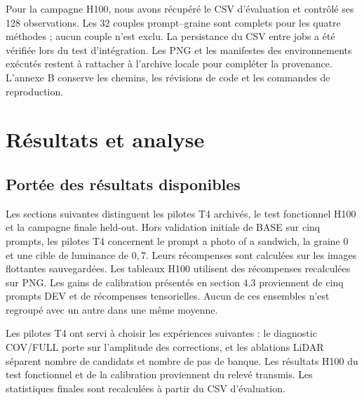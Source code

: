 \documentclass[11pt,a4paper]{article}
\begin{document}
Pour la campagne H100, nous avons récupéré le CSV d'évaluation et contrôlé ses 128 observations. Les 32 couples prompt--graine sont complets pour les quatre méthodes ; aucun couple n'est exclu. La persistance du CSV entre jobs a été vérifiée lors du test d'intégration. Les PNG et les manifestes des environnements exécutés restent à rattacher à l'archive locale pour compléter la provenance. L'annexe B conserve les chemins, les révisions de code et les commandes de reproduction.

\section{Résultats et analyse}
\subsection{Portée des résultats disponibles}
Les sections suivantes distinguent les pilotes T4 archivés, le test fonctionnel H100 et la campagne finale held-out. Hors validation initiale de BASE sur cinq prompts, les pilotes T4 concernent le prompt \og a photo of a sandwich\fg{}, la graine 0 et une cible de luminance de $0{,}7$. Leurs récompenses sont calculées sur les images flottantes sauvegardées. Les tableaux H100 utilisent des récompenses recalculées sur PNG. Les gains de calibration présentés en section 4.3 proviennent de cinq prompts DEV et de récompenses tensorielles. Aucun de ces ensembles n'est regroupé avec un autre dans une même moyenne.

Les pilotes T4 ont servi à choisir les expériences suivantes : le diagnostic COV/FULL porte sur l'amplitude des corrections, et les ablations LiDAR séparent nombre de candidats et nombre de pas de banque. Les résultats H100 du test fonctionnel et de la calibration proviennent du relevé transmis. Les statistiques finales sont recalculées à partir du CSV d'évaluation.
\end{document}
